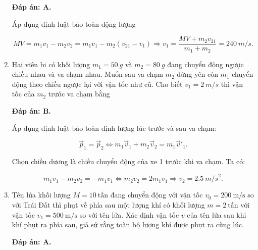 \begin{enumerate}[label=\bfseries Câu \arabic*:]
	\hideall
	{	
		\textbf{Đáp án: A.}
		
		Áp dụng định luật bảo toàn động lượng
		
		$$MV = m_1v_1 - m_2v_2 = m_1v_1 - m_2(v_{21}-v_1) \Rightarrow v_1= \dfrac{MV + m_2v_{21}}{m_1+m_2} = \SI{240}{m/s}.$$
	}
	\item {}
	
	
	{Hai viên bi có khối lượng $m_1 = \SI{50}{g}$ và $m_2 = \SI{80}{g}$ đang chuyển động ngược chiều nhau và va chạm nhau. Muốn sau va chạm $m_2$ đứng yên còn $m_1$ chuyển động theo chiều ngược lại với vận tốc như cũ. Cho biết $v_1 = \SI{2}{m/s}$ thì vận tốc của $m_2$ trước va chạm bằng 
	}
	
	\hideall
	{	
		\textbf{Đáp án: B.}
		
		Áp dụng định luật bảo toàn định lượng lúc trước và sau va chạm:
		
		$$ \vec p_1 = \vec p_2 \Leftrightarrow m_1 \vec v_1 + m_2 \vec v_2 = m_1 \vec v'_1.$$
		
		Chọn chiều dương là chiều chuyển động của xe 1 trước khi va chạm. Ta có:
		
		$$m_1 v_1 - m_2v_2 = - m_1v_1 \Leftrightarrow m_2v_2 = 2m_1v_1 \Rightarrow v_2 = \SI{2,5}{m/s}^2.$$
	}
	\item {}
	
	
	{Tên lửa khối lượng $M=10\ \text{tấn}$ đang chuyển động với vận tốc $v_0=200\ \text{m/s}$ so với Trái Đất thì phụt về phía sau một lượng khí có khối lượng $m=2\ \text{tấn}$ với vận tốc $v_1=500\ \text{m/s}$ so với tên lửa. Xác định vận tốc $v$ của tên lửa sau khi khí phụt ra phía sau, giả sử rằng toàn bộ lượng khí được phụt ra cùng lúc. 
	}
	
	\hideall
	{	
		\textbf{Đáp án: A.}
		
}
\end{enumerate}
